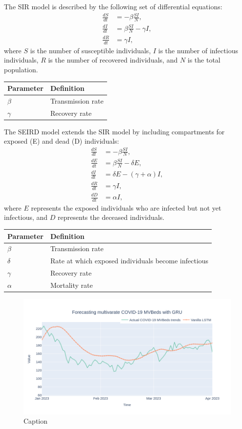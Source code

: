 \documentclass[12pt, letterpaper]{report}
\begin{document}
The SIR model is described by the following set of differential equations:
\begin{align}
\frac{dS}{dt} &= -\beta \frac{SI}{N}, \\
\frac{dI}{dt} &= \beta \frac{SI}{N} - \gamma I, \\
\frac{dR}{dt} &= \gamma I,
\end{align}
where $S$ is the number of susceptible individuals, $I$ is the number of infectious individuals, $R$ is the number of recovered individuals, and $N$ is the total population.
\begin{tabular}{ll}
\toprule
\textbf{Parameter} & \textbf{Definition} \\
\midrule
$\beta$ & Transmission rate \\
$\gamma$ & Recovery rate \\
\bottomrule
\end{tabular}
The SEIRD model extends the SIR model by including compartments for exposed (E) and dead (D) individuals:
\begin{align}
\frac{dS}{dt} &= -\beta \frac{SI}{N}, \\
\frac{dE}{dt} &= \beta \frac{SI}{N} - \delta E, \\
\frac{dI}{dt} &= \delta E - (\gamma + \alpha) I, \\
\frac{dR}{dt} &= \gamma I, \\
\frac{dD}{dt} &= \alpha I,
\end{align}
where $E$ represents the exposed individuals who are infected but not yet infectious, and $D$ represents the deceased individuals.



\begin{tabular}{ll}
\toprule
\textbf{Parameter} & \textbf{Definition} \\
\midrule
$\beta$ & Transmission rate \\
$\delta$ & Rate at which exposed individuals become infectious \\
$\gamma$ & Recovery rate \\
$\alpha$ & Mortality rate \\
\bottomrule
\end{tabular}

\begin{figure}
    \centering
    \includegraphics{images/forecast_multivarate_GRU.png}
    \caption{Caption}
    \label{fig:enter-label}
\end{figure}




\end{document}
